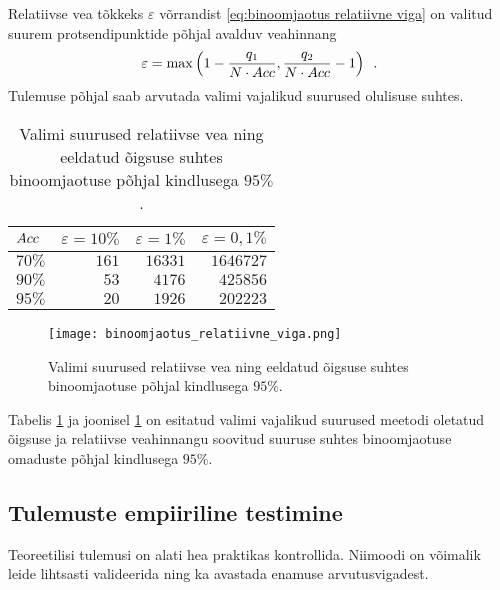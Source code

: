 Relatiivse vea tõkkeks $\varepsilon$ võrrandist \eqref{eq:binoomjaotus relatiivne viga} on valitud suurem protsendipunktide põhjal avalduv veahinnang
\begin{equation*}
    \varepsilon = \max \left( 1 - \frac{q_1}{N\cdot Acc} , \frac{q_2}{N\cdot Acc} - 1 \right) \enspace.
\end{equation*}
Tulemuse põhjal saab arvutada valimi vajalikud suurused olulisuse suhtes.

\begin{table}[H]
    \centering
    \caption{Valimi suurused relatiivse vea ning eeldatud õigsuse suhtes binoomjaotuse põhjal kindlusega $95\%$.}
    \begin{tabular}{l | r r r }
        $Acc$ & $\varepsilon=10\%$ & $\varepsilon=1\%$ & $\varepsilon=0{,}1\%$ \\
    	\hline
    	$70\%$ & $161$ & $16331$ & $1646727$ \\
    	$90\%$ & $53$  & $4176$  & $425856$  \\
    	$95\%$ & $20$   & $1926$  & $202223$  \\
    \end{tabular}
    \label{tab:binoomjaotus relatiivne viga}
\end{table}

\begin{figure}[H]
    \begin{center}
        \texttt{[image: binoomjaotus\_relatiivne\_viga.png]}
    \end{center}
    \caption{Valimi suurused relatiivse vea ning eeldatud õigsuse suhtes binoomjaotuse põhjal kindlusega $95\%$.}
    \label{fig:binoomjaotus relatiivne viga}
\end{figure}

Tabelis \ref{tab:binoomjaotus relatiivne viga} ja joonisel \ref{fig:binoomjaotus relatiivne viga} on esitatud valimi vajalikud suurused meetodi oletatud õigsuse ja relatiivse veahinnangu soovitud suuruse suhtes binoomjaotuse omaduste põhjal kindlusega $95\%$.

\subsection{Tulemuste empiiriline testimine}
Teoreetilisi tulemusi on alati hea praktikas kontrollida. Niimoodi on võimalik leide lihtsasti valideerida ning ka avastada enamuse arvutusvigadest.

